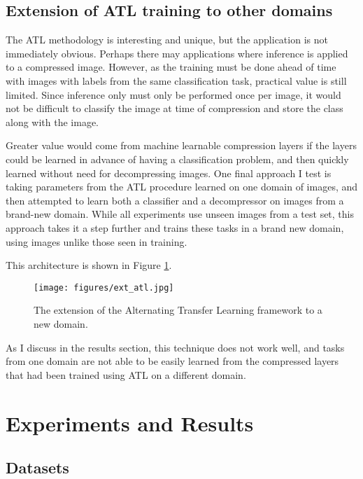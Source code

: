 \documentclass[twoside,11pt]{article}
\begin{document}
\subsection{Extension of ATL training to other domains}

The ATL methodology is interesting and unique, but the application is not immediately obvious.
Perhaps there may applications where inference is applied to a compressed image. 
However, as the training must be done ahead of time with images with labels from the 
same classification task, practical value is still limited. Since inference only must
only be performed once per image, it would not be difficult to classify the image at time of 
compression and store the class along with the image.

Greater value would come from machine learnable compression layers if the layers could
be learned in advance of having a classification problem, and then quickly learned without
need for decompressing images. One final approach I test is taking parameters from the ATL 
procedure learned on one domain of images, and then attempted to learn both a classifier
and a decompressor on images from a brand-new domain. While all experiments use unseen images from a test
set, this approach takes it a step further and trains these tasks in a brand new domain,
using images unlike those seen in training. 

This architecture is shown in Figure \ref{fig:ext_atl}.

\begin{figure}[h]
  \texttt{[image: figures/ext\_atl.jpg]}
  \caption{The extension of the Alternating Transfer Learning framework to a new domain.}
  \label{fig:ext_atl}
\end{figure}

As I discuss in the results section, this technique does not work well, and tasks from 
one domain are not able to be easily learned from the compressed layers that had been trained
using ATL on a different domain. 










\section{Experiments and Results} \label{results}


\subsection{Datasets}
\end{document}
